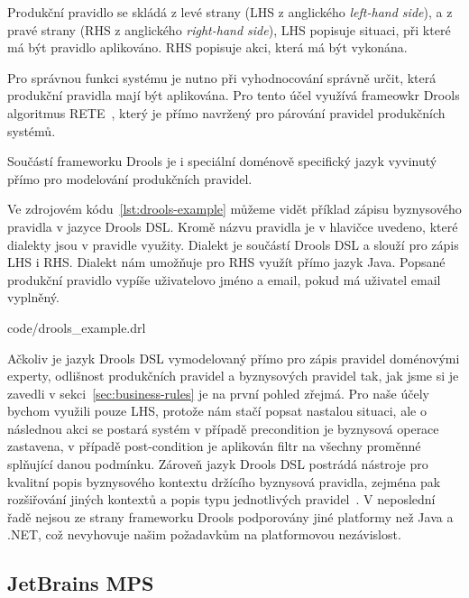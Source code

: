 Produkční pravidlo se skládá z levé strany (\gls{LHS} z anglického \textit{left-hand side}),
a z pravé strany (\gls{RHS} z anglického \textit{right-hand side}),
\gls{LHS} popisuje situaci, při které má být pravidlo aplikováno. \gls{RHS} popisuje akci,
která má být vykonána.

Pro správnou funkci systému je nutno při vyhodnocování správně určit, která produkční pravidla
mají být aplikována. Pro tento účel využívá frameowkr Drools algoritmus RETE~\cite{forgy1988rete},
který je přímo navržený pro párování pravidel produkčních systémů.

Součástí frameworku Drools je i speciální doménově specifický jazyk vyvinutý přímo
pro modelování produkčních pravidel.

Ve zdrojovém kódu~\ref{lst:drools-example} můžeme vidět příklad zápisu
byznysového pravidla v jazyce Drools DSL. Kromě názvu pravidla je v hlavičce
uvedeno, které dialekty jsou v pravidle využity. Dialekt  je součástí
Drools \gls{DSL} a slouží pro zápis \gls{LHS} i \gls{RHS}. Dialekt 
nám umožňuje pro \gls{RHS} využít přímo jazyk Java. Popsané produkční pravidlo
vypíše uživatelovo jméno a email, pokud má uživatel email vyplněný.


{code/drools_example.drl}

Ačkoliv je jazyk Drools \gls{DSL} vymodelovaný přímo pro zápis pravidel doménovými experty,
odlišnost produkčních pravidel a byznysových pravidel tak, jak jsme si je zavedli v sekci~\ref{sec:business-rules}
je na první pohled zřejmá. Pro naše účely bychom využili pouze \gls{LHS}, protože nám stačí
popsat nastalou situaci, ale o následnou akci se postará systém \textendash v případě
precondition je byznysová operace zastavena, v případě post-condition je aplikován filtr
na všechny proměnné splňující danou podmínku. Zároveň jazyk Drools \gls{DSL} postrádá
nástroje pro kvalitní popis byznysového kontextu držícího byznysová pravidla,
zejména pak rozšiřování jiných kontextů a popis typu jednotlivých pravidel~\cite{cemus2017automated}.
V neposlední řadě nejsou ze strany frameworku Drools podporovány jiné platformy než
Java a .NET, což nevyhovuje našim požadavkům na platformovou nezávislost.

\subsection{JetBrains MPS}

